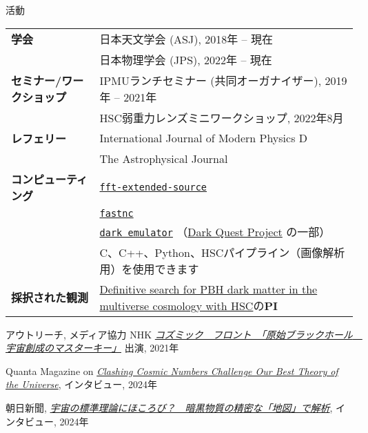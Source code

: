 \begin{rSection}{活動}
  \begin{tabular}{ @{} >{\bfseries}l @{\hspace{6ex}} p{}}
  学会                        & 日本天文学会 (ASJ), 2018年 -- 現在 \\
                              & 日本物理学会 (JPS), 2022年 -- 現在  \\
  セミナー/ワークショップ     & IPMUランチセミナー (共同オーガナイザー), 2019年 -- 2021年 \\
                              & HSC弱重力レンズミニワークショップ, 2022年8月  \\
  レフェリー                  & International Journal of Modern Physics D \\
                              & The Astrophysical Journal \\
  コンピューティング          & \href{https://github.com/git-sunao/fft-extended-source}{\tt fft-extended-source} \\
                              & \href{https://github.com/git-sunao/fastnc}{\tt fastnc} \\
                              & \href{https://dark-emulator.readthedocs.io/en/latest/}{\tt dark emulator} （\href{https://darkquestcosmology.github.io}{Dark Quest Project} の一部） \\
                              & C、C++、Python、HSCパイプライン（画像解析用）を使用できます \\
  採択された観測              & \href{https://subarutelescope.org/Observing/Schedule/S20B_abstract/S20B0032abst.html}{Definitive search for PBH dark matter in the multiverse cosmology with HSC}の\textbf{PI}
  \end{tabular}
\end{rSection}

\begin{rSection}{アウトリーチ, メディア協力}
  NHK \href{https://www.nhk-ondemand.jp/goods/G2021114366SA000/}{\textit{コズミック　フロント　「原始ブラックホール　宇宙創成のマスターキー」}} 出演, 2021年

  Quanta Magazine on \href{https://www.quantamagazine.org/clashing-cosmic-numbers-challenge-our-best-theory-of-the-universe-20240119/}{\textit{Clashing Cosmic Numbers Challenge Our Best Theory of the Universe}}, インタビュー, 2024年
  
  朝日新聞, \href{https://www.asahi.com/articles/ASR4H415RR48ULBH001.html}{\textit{宇宙の標準理論にほころび？　暗黒物質の精密な「地図」で解析}}, インタビュー, 2024年
\end{rSection}
